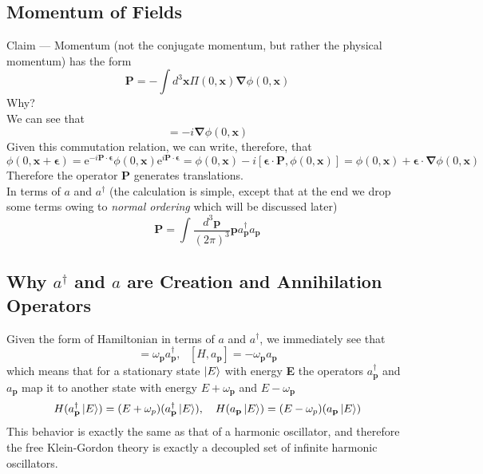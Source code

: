 \documentclass[11pt, notitlepage]{report}
\newcommand{\e}{\mathrm{e}}
\newcommand{\w}{\omega}
\numberwithin{equation}{section}
\begin{document}
    \subsection{Momentum of Fields}
    Claim — Momentum (not the conjugate momentum, but rather the physical momentum) has the form 
    \begin{equation}
        \textbf{P} = -\int d^3\textbf{x}\Pi(0, \textbf{x}) \mathbf{\nabla} \phi(0, \textbf{x}) 
    \end{equation}
    Why?\\
    We can see that  
    \begin{equation*}
        [\textbf{P}, \phi(0, \textbf{x})] = -i\mathbf{\nabla}\phi(0, \textbf{x})
    \end{equation*}
    Given this commutation relation, we can write, therefore, that 
    \begin{equation}
        \phi(0, \textbf{x} + \mathbf{\epsilon}) = \e^{-i\textbf{P}\cdot\mathbf{\epsilon}}\phi(0, \textbf{x})\e^{i\textbf{P}\cdot\mathbf{\epsilon}} = \phi(0, \textbf{x}) - i[\mathbf{\epsilon}\cdot\textbf{P}, \phi(0, \textbf{x})] = \phi(0, \textbf{x}) + \mathbf{\epsilon}\cdot \mathbf{\nabla}\phi(0, \textbf{x})
    \end{equation}
    Therefore the operator \(\textbf{P}\) generates translations.\\

    In terms of \(a\) and \(a^\dagger\) (the calculation is simple, except that at the end we drop some terms owing to \textit{normal ordering} which will be discussed later) 
    \begin{equation}
        \textbf{P} = \int \frac{d^3\textbf{p}}{(2\pi)^3} \textbf{p}a^\dagger_\textbf{p} a_\textbf{p}
    \end{equation}

    \subsection{Why \(a^\dagger\) and \(a\) are Creation and Annihilation Operators}
    Given the form of Hamiltonian in terms of \(a\) and \(a^\dagger\), we immediately see that 
    \begin{equation}
        [H, a^\dagger_\textbf{p}] = \w_\textbf{p}a^\dagger_\textbf{p},~~~[H, a_\textbf{p}] = -\w_\textbf{p}a_\textbf{p}
    \end{equation}
    which means that for a stationary state \(\ket{E}\) with energy \textbf{E} the operators \(a^\dagger_\textbf{p}\) and \(a_\textbf{p}\) map it to another state with energy \(E+\w_\textbf{p}\) and \(E-\w_\textbf{p}\)
    \begin{equation}
        H(a^\dagger_\textbf{p}\ket{E}) = (E + \omega_p)(a^\dagger_\textbf{p}\ket{E}),~~~ H(a_\textbf{p}\ket{E}) = (E - \omega_p)(a_\textbf{p}\ket{E})
    \end{equation}
    This behavior is exactly the same as that of a harmonic oscillator, and therefore the free Klein-Gordon theory is exactly a decoupled set of infinite harmonic oscillators. 
\end{document}
